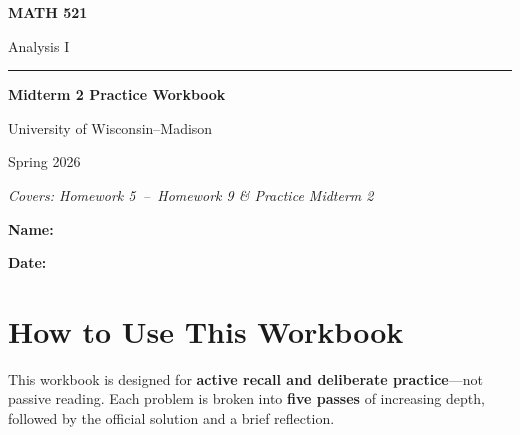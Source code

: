 \documentclass[12pt]{article}
\begin{document}
\begin{titlepage}
\centering
\vspace*{2.5cm}
{\Huge\bfseries MATH 521 \par}
\vspace{0.4cm}
{\Large Analysis I \par}
\vspace{1.2cm}
\rule{0.55\linewidth}{1pt}
\vspace{1.2cm}

{\huge\bfseries Midterm 2 Practice Workbook \par}
\vspace{1.5cm}

{\large University of Wisconsin--Madison\par}
{\large Spring 2026\par}
\vspace{2.0cm}

{\normalsize\itshape Covers: Homework 5 \,--\, Homework 9 \& Practice Midterm 2\par}
\vspace{3.5cm}

{\large\bfseries Name:\enspace\hrulefill\par}
\vspace{0.9cm}
{\large\bfseries Date:\enspace\hrulefill\par}
\end{titlepage}

\tableofcontents
\newpage

\section*{How to Use This Workbook}

This workbook is designed for \textbf{active recall and deliberate practice}---not passive
reading.  Each problem is broken into \textbf{five passes} of increasing depth, followed
by the official solution and a brief reflection.
\end{document}
